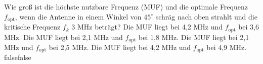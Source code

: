     {Wie groß ist die höchste nutzbare Frequenz (MUF) und die optimale Frequenz $f_{\textrm{opt}}$, wenn die Antenne in einem Winkel von $45^\circ$ schräg nach oben strahlt und die kritische Frequenz $f_{k}$ 3 MHz beträgt?}
    {Die MUF liegt bei 4,2 MHz und $f_{\textrm{opt}}$ bei 3,6 MHz.}
    {Die MUF liegt bei 2,1 MHz und $f_{\textrm{opt}}$ bei 1,8 MHz.}
    {Die MUF liegt bei 2,1 MHz und $f_{\textrm{opt}}$ bei 2,5 MHz.}
    {Die MUF liegt bei 4,2 MHz und $f_{\textrm{opt}}$ bei 4,9 MHz.}
    {false}{false}